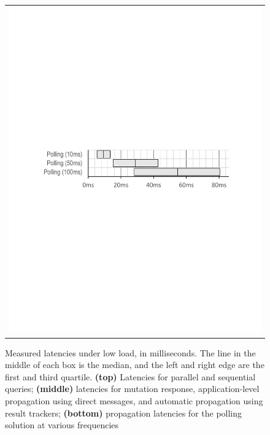 \begin{figure}
\begin{tabular}{c}
\includegraphics[width=\columnwidth, viewport=85 354 534 444]{figs/polling-latencies}\\
\end{tabular}
\caption{Measured latencies under low load, in milliseconds. The line in the middle of each box is the median, and the left and right edge are the first and third quartile. \textbf{(top)} Latencies for parallel and sequential queries; \textbf{(middle)} latencies for mutation response, application-level propagation using direct messages, and automatic propagation using result trackers; \textbf{(bottom)} propagation latencies for the polling solution at various frequencies}\label{fig:querylatencies}
\end{figure}


